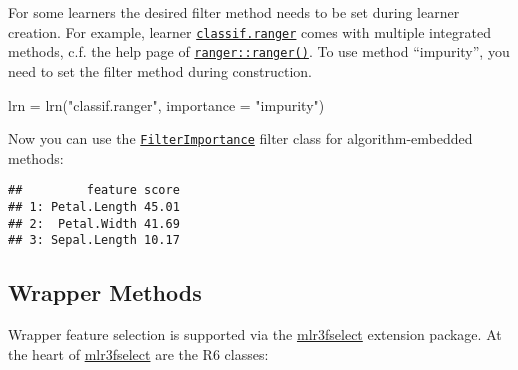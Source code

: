 \documentclass[
]{scrbook}
\newenvironment{Shaded}{\begin{snugshade}}{\end{snugshade}}
\newcommand{\AttributeTok}[1]{\textcolor[rgb]{0.77,0.63,0.00}{#1}}
\newcommand{\DecValTok}[1]{\textcolor[rgb]{0.00,0.00,0.81}{#1}}
\newcommand{\FunctionTok}[1]{\textcolor[rgb]{0.00,0.00,0.00}{#1}}
\newcommand{\NormalTok}[1]{#1}
\newcommand{\OtherTok}[1]{\textcolor[rgb]{0.56,0.35,0.01}{#1}}
\newcommand{\SpecialCharTok}[1]{\textcolor[rgb]{0.00,0.00,0.00}{#1}}
\newcommand{\StringTok}[1]{\textcolor[rgb]{0.31,0.60,0.02}{#1}}
\renewenvironment{Shaded} {\begin{snugshade}\small} {\end{snugshade}}
\begin{document}
For some learners the desired filter method needs to be set during learner creation.
For example, learner \href{https://mlr3learners.mlr-org.com/reference/mlr_learners_classif.ranger.html}{\texttt{classif.ranger}} comes with multiple integrated methods, c.f. the help page of \href{https://www.rdocumentation.org/packages/ranger/topics/ranger}{\texttt{ranger::ranger()}}.
To use method ``impurity'', you need to set the filter method during construction.

\begin{Shaded}
\begin{Highlighting}[]
\NormalTok{lrn }\OtherTok{=} \FunctionTok{lrn}\NormalTok{(}\StringTok{"classif.ranger"}\NormalTok{, }\AttributeTok{importance =} \StringTok{"impurity"}\NormalTok{)}
\end{Highlighting}
\end{Shaded}

Now you can use the \href{https://mlr3filters.mlr-org.com/reference/mlr_filters_importance.html}{\texttt{FilterImportance}} filter class for algorithm-embedded methods:

\begin{Shaded}
\end{Shaded}

\begin{verbatim}
##         feature score
## 1: Petal.Length 45.01
## 2:  Petal.Width 41.69
## 3: Sepal.Length 10.17
\end{verbatim}

\hypertarget{fs-wrapper}{%
\subsection{Wrapper Methods}\label{fs-wrapper}}

Wrapper feature selection is supported via the \href{https://mlr3fselect.mlr-org.com}{mlr3fselect} extension package.
At the heart of \href{https://mlr3fselect.mlr-org.com}{mlr3fselect} are the R6 classes:
\end{document}
